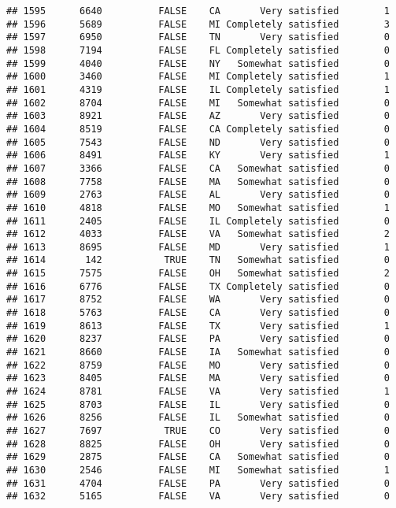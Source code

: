 \documentclass[]{book}
\theoremstyle{definition}
\theoremstyle{definition}
\theoremstyle{remark}
\begin{document}
\begin{verbatim}
## 1595      6640          FALSE    CA       Very satisfied        1
## 1596      5689          FALSE    MI Completely satisfied        3
## 1597      6950          FALSE    TN       Very satisfied        0
## 1598      7194          FALSE    FL Completely satisfied        0
## 1599      4040          FALSE    NY   Somewhat satisfied        0
## 1600      3460          FALSE    MI Completely satisfied        1
## 1601      4319          FALSE    IL Completely satisfied        1
## 1602      8704          FALSE    MI   Somewhat satisfied        0
## 1603      8921          FALSE    AZ       Very satisfied        0
## 1604      8519          FALSE    CA Completely satisfied        0
## 1605      7543          FALSE    ND       Very satisfied        0
## 1606      8491          FALSE    KY       Very satisfied        1
## 1607      3366          FALSE    CA   Somewhat satisfied        0
## 1608      7758          FALSE    MA   Somewhat satisfied        0
## 1609      2763          FALSE    AL       Very satisfied        0
## 1610      4818          FALSE    MO   Somewhat satisfied        1
## 1611      2405          FALSE    IL Completely satisfied        0
## 1612      4033          FALSE    VA   Somewhat satisfied        2
## 1613      8695          FALSE    MD       Very satisfied        1
## 1614       142           TRUE    TN   Somewhat satisfied        0
## 1615      7575          FALSE    OH   Somewhat satisfied        2
## 1616      6776          FALSE    TX Completely satisfied        0
## 1617      8752          FALSE    WA       Very satisfied        0
## 1618      5763          FALSE    CA       Very satisfied        0
## 1619      8613          FALSE    TX       Very satisfied        1
## 1620      8237          FALSE    PA       Very satisfied        0
## 1621      8660          FALSE    IA   Somewhat satisfied        0
## 1622      8759          FALSE    MO       Very satisfied        0
## 1623      8405          FALSE    MA       Very satisfied        0
## 1624      8781          FALSE    VA       Very satisfied        1
## 1625      8703          FALSE    IL       Very satisfied        0
## 1626      8256          FALSE    IL   Somewhat satisfied        0
## 1627      7697           TRUE    CO       Very satisfied        0
## 1628      8825          FALSE    OH       Very satisfied        0
## 1629      2875          FALSE    CA   Somewhat satisfied        0
## 1630      2546          FALSE    MI   Somewhat satisfied        1
## 1631      4704          FALSE    PA       Very satisfied        0
## 1632      5165          FALSE    VA       Very satisfied        0

\end{verbatim}
\end{document}
